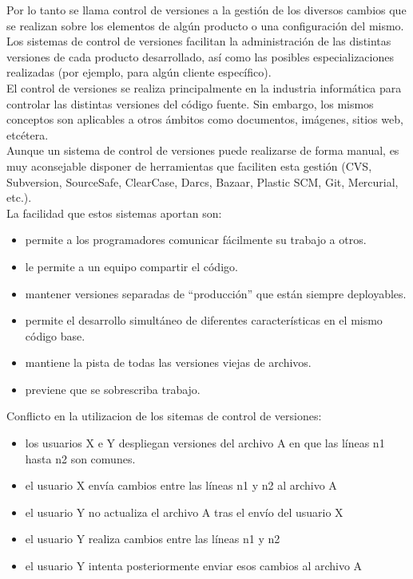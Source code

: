 Por lo tanto se llama control de versiones a la gestión de los diversos cambios que se realizan sobre los elementos de algún producto o una configuración del mismo. Los sistemas de control de versiones facilitan la administración de las distintas versiones de cada producto desarrollado, así como las posibles especializaciones realizadas (por ejemplo, para algún cliente específico).\\

El control de versiones se realiza principalmente en la industria informática para controlar las distintas versiones del código fuente. Sin embargo, los mismos conceptos son aplicables a otros ámbitos como documentos, imágenes, sitios web, etcétera.\\

Aunque un sistema de control de versiones puede realizarse de forma manual, es muy aconsejable disponer de herramientas que faciliten esta gestión (CVS, Subversion, SourceSafe, ClearCase, Darcs, Bazaar, Plastic SCM, Git, Mercurial, etc.).\\

La facilidad que estos sistemas aportan son:
\begin{itemize}
\item permite a los programadores comunicar fácilmente su trabajo a otros.
\item le permite a un equipo compartir el código.
\item mantener versiones separadas de “producción” que están siempre deployables.
\item permite el desarrollo simultáneo de diferentes características en el mismo código base.
\item mantiene la pista de todas las versiones viejas de archivos.
\item previene que se sobrescriba trabajo.
\end{itemize}

Conflicto en la utilizacion de los sitemas de control de versiones:
\begin{itemize}
  \item los usuarios X e Y despliegan versiones del archivo A en que las líneas n1 hasta n2 son comunes.
  \item el usuario X envía cambios entre las líneas n1 y n2 al archivo A
  \item el usuario Y no actualiza el archivo A tras el envío del usuario X
  \item el usuario Y realiza cambios entre las líneas n1 y n2
  \item el usuario Y intenta posteriormente enviar esos cambios al archivo A 
\end{itemize}

